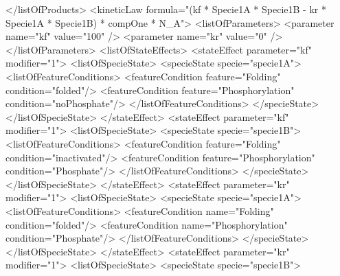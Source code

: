 \documentclass{cekarticle}
\newenvironment{changemargin}[2]{\begin{list}{}{%
\setlength{\leftmargin}{0pt}%
\setlength{\rightmargin}{0pt}%
\setlength{\listparindent}{\parindent}%
\setlength{\itemindent}{\parindent}%
\addtolength{\leftmargin}{#1}%
\addtolength{\rightmargin}{#2}%
}\item }{\end{list}}
\begin{document}
\begin{changemargin}{-2cm}{0cm}
\begin{example}
                    </listOfProducts>
                    <kineticLaw formula="(kf * Specie1A * Specie1B - kr * Specie1A * Specie1B) * compOne * N_A">
                        <listOfParameters>
                            <parameter name="kf" value="100" />
                            <parameter name="kr" value="0" />
                        </listOfParameters>
                        <listOfStateEffects>
                            <stateEffect parameter="kf" modifier="1">
                                <listOfSpecieState>
                                    <specieState specie="specie1A">
                                        <listOfFeatureConditions>
                                            <featureCondition feature="Folding" condition="folded"/>
                                            <featureCondition feature="Phosphorylation" condition="noPhosphate"/>
                                        </listOfFeatureConditions>
                                    </specieState>
                                </listOfSpecieState>
                            </stateEffect>  
                            <stateEffect parameter="kf" modifier="1">
                                <listOfSpecieState>
                                    <specieState specie="specie1B">
                                        <listOfFeatureConditions>
                                            <featureCondition feature="Folding" condition="inactivated"/>
                                            <featureCondition feature="Phosphorylation" condition="Phosphate"/>
                                        </listOfFeatureConditions>
                                    </specieState>
                                </listOfSpecieState>
                            </stateEffect>  
                            <stateEffect parameter="kr" modifier="1">
                                <listOfSpecieState>
                                    <specieState specie="specie1A">
                                        <listOfFeatureConditions>
                                            <featureCondition name="Folding"  condition="folded"/>
                                            <featureCondition name="Phosphorylation" condition="Phosphate"/>
                                        </listOfFeatureConditions>
                                    </specieState>
                                </listOfSpecieState>
                            </stateEffect>  
                            <stateEffect parameter="kr" modifier="1">
                                <listOfSpecieState>
                                    <specieState specie="specie1B">                                    

\end{example}
\end{changemargin}
\end{document}
